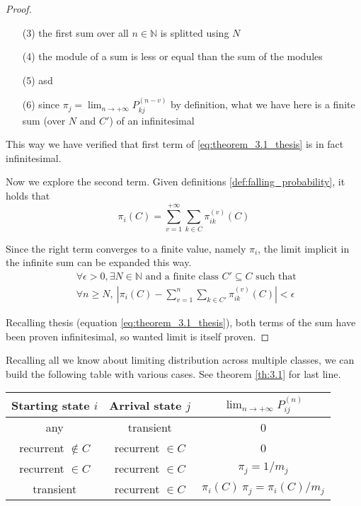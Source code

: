 \begin{proof}
\begin{itemize}
			\item [(3)] the first sum over all $n \in \mathbb{N}$ is splitted using $N$
			\item [(4)] the module of a sum is less or equal than the sum of the modules
			\item [(5)] asd
			\item [(6)] since $\pi_j = \lim_{n \to +\infty} P_{kj}^{(n-v)}$ by definition, what we have here is a finite sum (over $N$ and $C'$) of an infinitesimal
		\end{itemize}
		This way we have verified that first term of \ref{eq:theorem_3.1_thesis} is in fact infinitesimal.

		\bigbreak
		Now we explore the second term.
		Given definitions \ref{def:falling_probability}, it holds that
		$$ \pi_i(C) = \sum_{v = 1}^{+\infty} \sum_{k \in C} \pi_{ik}^{(v)}(C) $$

		\smallbreak
		Since the right term converges to a finite value, namely $\pi_i$, the limit implicit in the infinite sum can be expanded this way.
		\begin{equation}\begin{split} \label{eq:pi_limit_definition}
			& \forall \epsilon > 0, \exists N \in \mathbb{N} \text{ and a finite class } C' \subseteq C \text{ such that } \\
			& \forall n \ge N,~ \left| \pi_i(C) - \sum_{v = 1}^{n} \sum_{k \in C'} \pi_{ik}^{(v)}(C) \right| < \epsilon
		\end{split}\end{equation}

		\bigbreak
		Recalling thesis (equation \ref{eq:theorem_3.1_thesis}), both terms of the sum have been proven infinitesimal, so wanted limit is itself proven.
	\end{proof}

	Recalling all we know about limiting distribution across multiple classes, we can build the following table with various cases.
	See theorem \ref{th:3.1} for last line.
	\begin{center}\begin{tabular}{c|c|c}
		Starting state $i$ & Arrival state $j$ & $\lim_{n \to +\infty} P_{ij}^{(n)}$ \\ \hline
		any & transient & 0 \\
		recurrent $\notin C$ & recurrent $\in C$ & 0 \\
		recurrent $\in C$ & recurrent $\in C$ & $\pi_j = 1 / m_j$ \\
		transient & recurrent $\in C$ & $\pi_i(C)~\pi_j = \pi_i(C) / m_j$ \\
	\end{tabular}\end{center}

